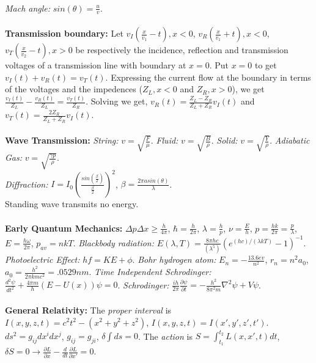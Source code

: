 \\
\emph{Mach angle:} $sin( \theta)= {\frac u v}$.  \\
\\
{\bf Transmission boundary:} Let 
$v_I({\frac {x}{v_1}}-t), x < 0$,
$v_R({\frac {x}{v_1}}+t), x < 0$,
$v_T({\frac {x}{v_2}}-t), x > 0$ be respectively the incidence,
reflection and transmission voltages of a transmission line with boundary
at $x=0$.  Put $x=0$ to get 
$v_I(t)+v_R(t)=v_T(t)$. Expressing the current
flow at the boundary in terms of the voltages and the impedences ($Z_L, x<0$ and
$Z_R, x>0$), we get
${\frac {v_I(t)} {Z_L}}-{\frac {v_R(t)} {Z_L}}={\frac {v_T(t)} {Z_R}}$.
Solving we get, $v_R(t)= {\frac {Z_L-Z_R}{Z_L+Z_R}}v_I(t)$ and
$v_T(t)= {\frac {2Z_R}{Z_L+Z_R}}v_I(t)$.
\\
\\
{\bf Wave Transmission:}
\emph{String:} $v= {\sqrt {\frac F \mu}}$.
\emph{Fluid:} $v= {\sqrt {\frac B \rho}}$.
\emph{Solid:} $v= {\sqrt {\frac Y \rho}}$.
\emph{Adiabatic Gas:} $v= {\sqrt {\frac {\gamma p } \rho}}$.\\
\emph{Diffraction:} $I = I_0 ({\frac {sin({\frac {\beta} {2}})} {\frac {\beta}{2}}})^2$,
$\beta = {\frac {2 \pi a sin( \theta )} {\lambda}}$.
\\
Standing wave transmits no energy.
\\
\\
{\bf Early Quantum Mechanics:} $\Delta p \Delta x \geq {\frac {h} {4 \pi}}$,
$\hbar = {\frac {h}{2 \pi}}$,
$\lambda = {\frac {h}{p}}$,
$\nu = {\frac {E}{h}}$,
$p = {\frac { h k }{ 2 \pi }} = {\frac {p}{\lambda}}$,
$E = {\frac {h \omega}{2 \pi}}$,
$p_{av} = n k T$. \emph{Blackbody radiation:}
$E(\lambda , T ) = {\frac {8 \pi h c} {(\lambda^{5})}} (e^{{(h c)} /
{(\lambda k T )}}- 1)^{-1}$.  
\emph{Photoelectric Effect:} $hf= KE+ \phi$.
\emph{Bohr hydrogen atom:} $E_n = -{\frac {13.6 ev} {n^2}}$, $r_n=n^2a_0$,
$a_0= {\frac {h^2} {2 \pi k m c^2}}= .0529 nm$.
\emph{Time Independent Schrodinger:}
${\frac {d^2 \psi} {dt^2}}+{\frac {4 \pi m} {h}}(E-U(x)) \psi = 0$.
\emph{Schrodinger:}
${\frac {ih} {2 \pi}} {\frac {\partial \psi} {\partial t}} =
-{\frac {h^2} {8 \pi^2 m}} \nabla^2 \psi + V \psi$.
\\
\\
{\bf General Relativity:}
The \emph{proper interval} is $I(x,y,z,t)= c^2 t^2 - (x^2 + y^2 +z^2 )$, 
$I(x,y,z,t)=I(x',y',z',t')$.
$ds^{2}= g_{ij} dx^{i} dx^{j}$, $g_{ij} = g_{ji}$, $\delta \int {ds} = 0$.
The \emph{action} is $S= \int_{t_1}^{t_2} L(x, x', t) dt$, $\delta S=0 \rightarrow 
{\frac {\partial L} {\partial x}}- {\frac d {dt}} {\frac {\partial L} {\partial x'}}=0$.
